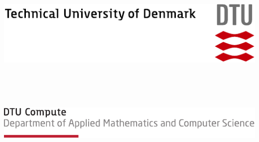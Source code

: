 \begin{titlepage}
    \enlargethispage{1.3cm}
    \raggedleft
    \includegraphics[width=.6\textwidth]{gfx/dtu_logo.pdf}\par
    \raggedright
    
    \vspace{1cm}
    
    {\sffamily\LARGE{\@author\\}}
    \vspace{2cm}
    {\sffamily\Huge\textbf{\@title}}\\
    \vspace{.5cm}
    {\sffamily\Large{\course\\ \vspace{.5cm} \@date}}
    
    \vspace{.5cm}
    
    
    \includegraphics[width=.7\textwidth]{gfx/dtu_compute.pdf}
\end{titlepage}